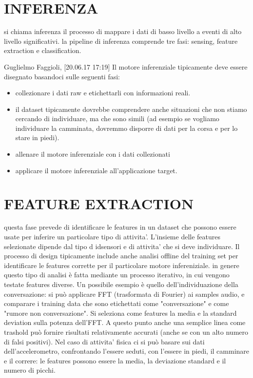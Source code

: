 \documentclass{article}
\begin{document}
\section{INFERENZA}
si chiama inferenza il processo di mappare i dati di basso livello a eventi di alto livello significativi.
la pipeline di inferenza comprende tre fasi: sensing, feature extraction e classification.

Guglielmo Faggioli, [20.06.17 17:19]
Il motore inferenziale tipicamente deve essere disegnato basandoci sulle seguenti fasi:
\begin{itemize}
\item collezionare i dati raw e etichettarli con informazioni reali.
\item il dataset tipicamente dovrebbe comprendere anche situazioni che non stiamo cercando di individuare, ma che sono simili (ad esempio se vogliamo individuare la camminata, dovremmo disporre di dati per la corsa e per lo stare in piedi).
\item allenare il motore inferenziale con i dati collezionati
\item applicare il motore inferenziale all'applicazione target.
\end{itemize}

\section{FEATURE EXTRACTION}
questa fase prevede di identificare le features in un dataset che possono essere usate per inferire un particolare tipo di attivita'.
L'insieme delle features selezionate dipende dal tipo d idsensori e di attivita' che si deve individuare. Il processo di design tipicamente include anche analisi offline del training set per identificare le features corrette per il particolare motore infereniziale. in genere questo tipo di analisi è fatta mediante un processo iterativo, in cui vengono testate features diverse.
Un possibile esempio è quello dell'individuazione della conversazione: si può applicare FFT (trasformata di Fourier) ai samples audio, e comparare i training data che sono etichettati come "conversazione" e come "rumore non conversazione". Si seleziona come features la media e la standard deviation sulla potenza dell'FFT. A questo punto anche una semplice linea come trashold può fornire risultati relativamente accurati (anche se con un alto numero di falsi positivi).
Nel caso di attivita' fisica ci si può basare sui dati dell'accelerometro, confrontando l'essere seduti, con l'essere in piedi, il camminare e il correre: le features possono essere la media, la deviazione standard e il numero di picchi.
\end{document}
